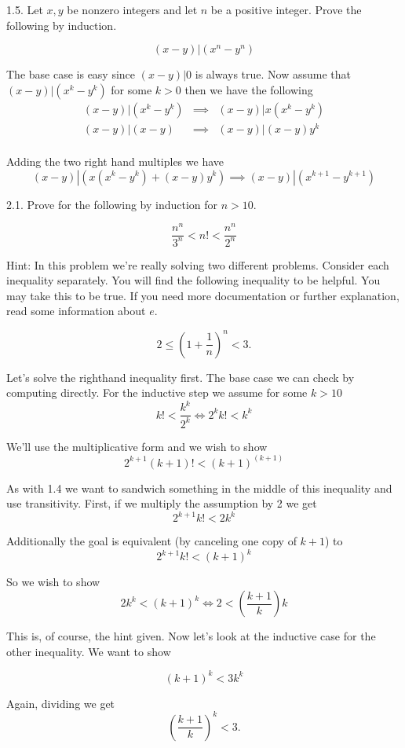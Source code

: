 \documentclass[16 pt]{amsart}
\theoremstyle{definition}
\theoremstyle{remark}
\numberwithin{equation}{subsection}
\begin{document}
1.5. Let $x,y$ be nonzero integers and let $n$ be a positive integer.  Prove the following by induction.

\[
(x-y) | (x^n - y^n)
\]

The base case is easy since $(x-y)|0$ is always true.
Now assume that $(x-y)|(x^k-y^k)$ for some $k>0$ then we have the following
\begin{eqnarray}
(x-y)|(x^k-y^k) & \implies & (x-y)| x(x^k-y^k) \\
(x-y)|(x-y) & \implies & (x-y)|(x-y)y^k\\
\end{eqnarray}

Adding the two right hand multiples we have
\[
(x-y) | (x(x^k-y^k) + (x-y)y^k) \implies (x-y)|(x^{k+1}-y^{k+1})
\]


2.1.  Prove for the following by induction for $n>10$.

\[
\frac{n^n}{3^n} < n! < \frac{n^n}{2^n}
\]

Hint:  In this problem we're really solving two different problems.  Consider each inequality separately.  You will find the following inequality to be helpful.  You may take this to be true.  If you need more documentation or further explanation, read some information about $e$.

\[
2\le \left( 1+ \frac{1}{n}\right)^n < 3.
\]

Let's solve the righthand inequality first.  The base case we can check by computing directly.  For the inductive step we assume for some $k>10$
\[
k! < \frac{k^k}{2^k} \iff 2^k k! < k^k
\]

We'll use the multiplicative form and we wish to show
\[
2^{k+1}(k+1)! < (k+1)^{(k+1)}
\]


As with 1.4 we want to sandwich something in the middle of this inequality and use transitivity.
First, if we multiply the assumption by 2 we get
\[
2^{k+1} k! < 2k^k
\]

Additionally the goal is equivalent (by canceling one copy of $k+1$) to
\[
2^{k+1} k! < (k+1)^k 
\]

So we wish to show
\[
2k^k < (k+1)^k \iff 2 < \left(\frac{k+1}{k}\right)k 
\]

This is, of course, the hint given.  Now let's look at the inductive case for the other inequality. We want to show

\[
(k+1)^k < 3 k^k 
\]

Again, dividing we get
\[
\left(\frac{k+1}{k}\right)^k < 3.
\]
\end{document}
